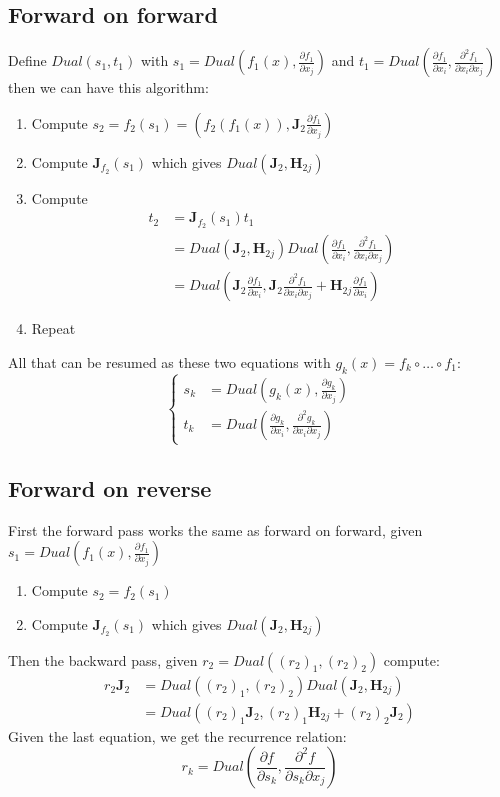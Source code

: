\documentclass[12pt, openany]{report}
\newcommand{\J}{\mathbf{J}}
\newcommand{\He}{\mathbf{H}}
\theoremstyle{definition}
\begin{document}
\subsection{Forward on forward}
Define $Dual(s_1,t_1)$ with $s_1 = Dual(f_1(x), \frac{\partial f_1}{\partial x_j})$ and $t_1 = Dual(\frac{\partial f_1}{\partial x_i}, \frac{\partial^2 f_1}{\partial x_i \partial x_j})$ then we can have this algorithm:
\begin{enumerate}
  \item Compute $s_2 = f_2(s_1) = (f_2(f_1(x)), \J_2 \frac{\partial f_1}{\partial x_j})$
  \item Compute $\J_{f_2}(s_1)$ which gives $Dual(\J_2, \He_{2j})$
  \item Compute \begin{equation} \begin{aligned} t_2 &= \J_{f_2}(s_1) t_1 \\ &= Dual(\J_2, \He_{2j}) Dual(\frac{\partial f_1}{\partial x_i}, \frac{\partial^2 f_1}{\partial x_i \partial x_j}) \\ &= Dual(\J_2 \frac{\partial f_1}{\partial x_i}, \J_2 \frac{\partial^2 f_1}{\partial x_i \partial x_j} + \He_{2j} \frac{\partial f_1}{\partial x_i}) \end{aligned} \end{equation}
  \item Repeat 
\end{enumerate}
All that can be resumed as these two equations with $g_k(x) = f_k \circ \dots \circ f_1$:
\begin{equation}
  \begin{cases}
    s_k &= Dual(g_k(x), \frac{\partial g_k}{\partial x_j})\\
    t_k &= Dual(\frac{\partial g_k}{\partial x_i}, \frac{\partial^2 g_k}{\partial x_i \partial x_j})
  \end{cases}
\end{equation}
\subsection{Forward on reverse}
First the forward pass works the same as forward on forward, given $s_1 = Dual(f_1(x), \frac{\partial f_1}{\partial x_j})$ 
\begin{enumerate}
  \item Compute $s_2 = f_2(s_1) $
  \item Compute $\J_{f_2}(s_1)$ which gives $Dual(\J_2, \He_{2j})$
\end{enumerate}
Then the backward pass, given $r_2 = Dual((r_2)_1, (r_2)_2)$ compute:
\begin{equation}
  \begin{aligned}
    r_2 \J_2 &= Dual((r_2)_1, (r_2)_2) Dual(\J_2, \He_{2j})\\ &= Dual((r_2)_1 \J_2, (r_2)_1 \He_{2j} + (r_2)_2 \J_2)
  \end{aligned}
\end{equation}
Given the last equation, we get the recurrence relation:
\begin{equation}
  r_k = Dual(\frac{\partial f}{\partial s_k}, \frac{\partial^2 f}{\partial s_k \partial x_j})
\end{equation}
\end{document}
